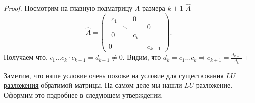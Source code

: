 \begin{proof}
    Посмотрим на главную подматрицу $A$ размера $k + 1$ $\hat{A}$
    \[
    \hat{A} = 
    \left(\begin{array}{c|c}
            \begin{array}{ccc}
                c_1 & & 0\\
                    &\ddots&\\
                0&&c_k
            \end{array} & 0 \\
            \hline
            0 & c_{k + 1}
    \end{array}\right)
    .\] 
    Получаем что, $c_1\dots c_k \cdot c_{k + 1} = d_{k + 1}\not=0$.
    Видим, что $d_k = c_1 \dots c_k \Rightarrow c_{k+1} = \frac{d_{k+1}}{d_{k}}$
\end{proof}
\begin{remark}
    Заметим, что наше условие очень похоже на 
    \hyperref[thm:LU разложение обратимой матрицы]
    {условие для существования $LU$ разложения} обратимой матрицы.
    На самом деле мы нашли $LU$ разложение.
    Оформим это подробнее в следующем утверждении.
\end{remark}
